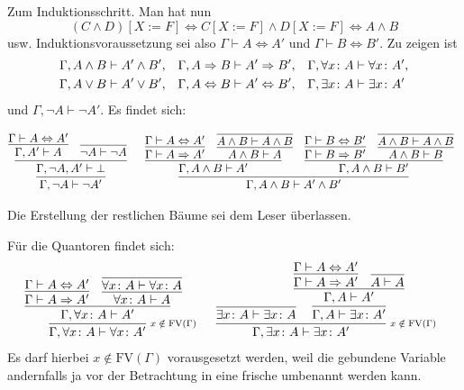 \begin{Beweis}
Zum Induktionsschritt. Man hat nun
\[(C\land D)[X{:=}F]
\iff C[X{:=}F]\land D[X{:=}F]\iff A\land B\]
usw. Induktionsvoraussetzung sei also $\Gamma\vdash A\Leftrightarrow A'$
und $\Gamma\vdash B\Leftrightarrow B'$. Zu zeigen ist
\begin{align*}
& \Gamma,A\land B\vdash A'\land B',
&& \Gamma,A\Rightarrow B\vdash A'\Rightarrow B',
&& \Gamma,\forall x\colon A\vdash\forall x\colon A',\\
& \Gamma,A\lor B\vdash A'\lor B',
&& \Gamma,A\Leftrightarrow B\vdash A'\Leftrightarrow B',
&& \Gamma,\exists x\colon A\vdash\exists x\colon A'
\end{align*}
und $\Gamma,\lnot A\vdash\lnot A'$. Es findet sich:
\begin{small}
\[
\begin{array}{@{}l@{\quad\;\;}l}
\infer{\Gamma,\lnot A\vdash\lnot A'}{
  \infer{\Gamma,\lnot A,A'\vdash\bot}{
    \infer{\Gamma,A'\vdash A}{\Gamma\vdash A\bicond A'}
  & \infer{\lnot A\vdash\lnot A}{}}}
&
\infer{\Gamma,A\land B\vdash A'\land B'}{
  \infer{\Gamma,A\land B\vdash A'}{
    \infer{\Gamma\vdash A\cond A'}{\Gamma\vdash A\bicond A'}
  & \infer{A\land B\vdash A}{
      \infer{A\land B\vdash A\land B}{}}}
& \infer{\Gamma,A\land B\vdash B'}{
    \infer{\Gamma\vdash B\cond B'}{\Gamma\vdash B\bicond B'}
  & \infer{A\land B\vdash B}{
      \infer{A\land B\vdash A\land B}{}}}}
\end{array}
\]
\end{small}%
Die Erstellung der restlichen Bäume sei dem Leser überlassen.

Für die Quantoren findet sich:
\[
\begin{array}{@{}l@{\quad\;\;}l}
\infer[\infernote{$x\notin\mathrm{FV}(\Gamma)$}]{\Gamma,\forall x\colon A\vdash\forall x\colon A'}{
  \infer{\Gamma,\forall x\colon A\vdash A'}{
    \infer{\Gamma\vdash A\cond A'}{\Gamma\vdash A\bicond A'}
  & \infer{\forall x\colon A\vdash A}{
      \infer{\forall x\colon A\vdash\forall x\colon A}{}}}}
&
\infer[\infernote{$x\notin\mathrm{FV}(\Gamma)$}]{\Gamma,\exists x\colon A\vdash\exists x\colon A'}{
  \infer{\exists x\colon A\vdash\exists x\colon A}{}\hspace{-12pt}
& \infer{\Gamma, A\vdash\exists x\colon A'}{
    \infer{\Gamma, A\vdash A'}{
      \infer{\Gamma\vdash A\cond A'}{
        \Gamma\vdash A\bicond A'}
    & \infer{A\vdash A}{}}}}
\end{array}
\]
Es darf hierbei $x\notin\mathrm{FV}(\Gamma)$ vorausgesetzt werden, weil
die gebundene Variable andernfalls ja vor der Betrachtung in eine
frische umbenannt werden kann.\,\qedsymbol
\end{Beweis}

